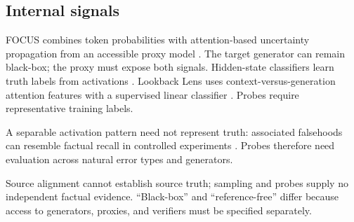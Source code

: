 \subsection{Internal signals}
FOCUS combines token probabilities with attention-based uncertainty propagation from an accessible proxy model \citep{zhang-etal-2023-enhancing-uncertainty}. The target generator can remain black-box; the proxy must expose both signals. Hidden-state classifiers learn truth labels from activations \citep{azaria-mitchell-2023-internal}. Lookback Lens uses context-versus-generation attention features with a supervised linear classifier \citep{chuang-etal-2024-lookback}. Probes require representative training labels.

A separable activation pattern need not represent truth: associated falsehoods can resemble factual recall in controlled experiments \citep{cheang-etal-2026-llms}. Probes therefore need evaluation across natural error types and generators.

Source alignment cannot establish source truth; sampling and probes supply no independent factual evidence. ``Black-box'' and ``reference-free'' differ because access to generators, proxies, and verifiers must be specified separately.
